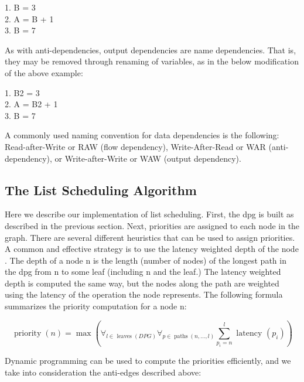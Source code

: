 \begin{center}
	1. B = 3 \\
	2. A = B + 1 \\
	3. B = 7
\end{center}
As with anti-dependencies, output dependencies are name dependencies. That is, they may be removed through renaming of variables, as in the below modification of the above example:

\begin{center}
	1. B2 = 3 \\
	2. A = B2 + 1 \\
	3. B = 7
\end{center}


A commonly used naming convention for data dependencies is the following: Read-after-Write or RAW (flow dependency), Write-After-Read or WAR (anti-dependency), or Write-after-Write or WAW (output dependency).

\subsection{The List Scheduling Algorithm}

Here we describe our implementation of list scheduling. First, the dpg is built as described in the previous
section. Next, priorities are assigned to each node in the graph. There are several different heuristics that
can be used to assign priorities. A common and effective strategy is to use the latency weighted depth of the
node \cite{gibbons1986efficient,landskov1980local}. The depth of a node n is the length (number of nodes) of the longest path in the dpg from n to
some leaf (including n and the leaf.) The latency weighted depth is computed the same way, but the nodes
along the path are weighted using the latency of the operation the node represents. The following formula
summarizes the priority computation for a node n:

$$
	\operatorname{priority}(n)=\max \left(\forall_{l \in \text { leaves }(D P G)} \forall_{p \in \operatorname{paths}(n, \ldots, l)} \sum_{p_i=n}^l \text { latency }\left(p_i\right)\right)
$$

Dynamic programming can be used to compute the priorities efficiently, and we take into consideration
the anti-edges described above:

